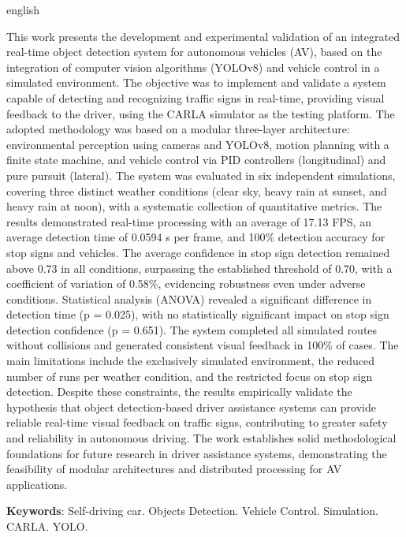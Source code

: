 \documentclass[
	12pt,				%
	oneside, %
	a4paper,			%
	english,			%
	french,				%
	spanish,			%
	brazil				%
	]{abntex2}
\begin{document}
\begin{resumo}[Abstract]
 \begin{otherlanguage*}{english}

This work presents the development and experimental validation of an integrated real-time object detection system for autonomous vehicles (AV), based on the integration of computer vision algorithms (YOLOv8) and vehicle control in a simulated environment. The objective was to implement and validate a system capable of detecting and recognizing traffic signs in real-time, providing visual feedback to the driver, using the CARLA simulator as the testing platform. The adopted methodology was based on a modular three-layer architecture: environmental perception using cameras and YOLOv8, motion planning with a finite state machine, and vehicle control via PID controllers (longitudinal) and pure pursuit (lateral). The system was evaluated in six independent simulations, covering three distinct weather conditions (clear sky, heavy rain at sunset, and heavy rain at noon), with a systematic collection of quantitative metrics. The results demonstrated real-time processing with an average of 17.13 FPS, an average detection time of 0.0594 s per frame, and 100\% detection accuracy for stop signs and vehicles. The average confidence in stop sign detection remained above 0.73 in all conditions, surpassing the established threshold of 0.70, with a coefficient of variation of 0.58\%, evidencing robustness even under adverse conditions. Statistical analysis (ANOVA) revealed a significant difference in detection time (p = 0.025), with no statistically significant impact on stop sign detection confidence (p = 0.651). The system completed all simulated routes without collisions and generated consistent visual feedback in 100\% of cases. The main limitations include the exclusively simulated environment, the reduced number of runs per weather condition, and the restricted focus on stop sign detection. Despite these constraints, the results empirically validate the hypothesis that object detection-based driver assistance systems can provide reliable real-time visual feedback on traffic signs, contributing to greater safety and reliability in autonomous driving. The work establishes solid methodological foundations for future research in driver assistance systems, demonstrating the feasibility of modular architectures and distributed processing for AV applications.



   \vspace{\onelineskip}
 
   \noindent 
    \textbf{Keywords}: Self-driving car. Objects Detection. Vehicle Control. Simulation. CARLA. YOLO.
 \end{otherlanguage*}
\end{resumo}
\end{document}
